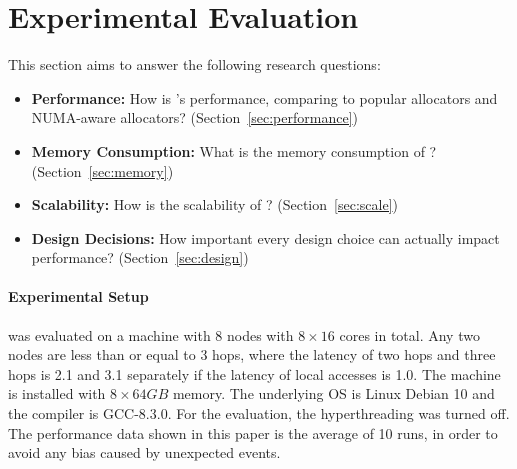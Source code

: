 \section{Experimental Evaluation}
\label{sec:evaluation}

This section aims to answer the following research questions: 

\begin{itemize}
\item \textbf{Performance:} How is \NM{}'s performance, comparing to popular allocators and NUMA-aware allocators? (Section~\ref{sec:performance}) 
\item \textbf{Memory Consumption:} What is the memory consumption of \NM{}? (Section~\ref{sec:memory})
\item \textbf{Scalability:} How is the scalability of \NM{}? (Section~\ref{sec:scale})
\item \textbf{Design Decisions:} How important every design choice can actually impact performance? (Section~\ref{sec:design})	
\end{itemize}

\paragraph{Experimental Setup}
 \NM{} was evaluated on a machine with 8 nodes with $8\times16$ cores in total. Any two nodes are less than or equal to 3 hops, where the latency of two hops and three hops is 2.1 and 3.1 separately if the latency of local accesses is 1.0. The machine is installed with $8\times64GB$ memory. The underlying OS is Linux Debian 10 and the compiler is GCC-8.3.0. For the evaluation, the hyperthreading was turned off. The performance data shown in this paper is the average of 10 runs, in order to avoid any bias caused by unexpected events.  

